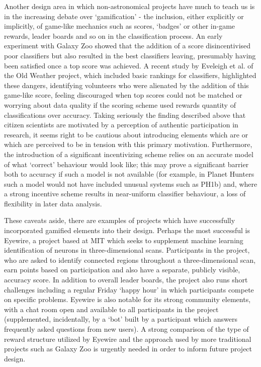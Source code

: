 \documentclass{ar2e}
\begin{document}
Another design area in which non-astronomical projects have much to teach us
is in the increasing debate over `gamification' - the inclusion, either
explicitly or implicitly, of game-like mechanics such as scores, `badges' or
other in-game rewards, leader boards and so on in the classification process.
An early experiment with Galaxy Zoo showed that the addition of a score
disincentivised poor classifiers but also resulted in the best classifiers
leaving, presumably having been satisfied once a top score was achieved. A
recent study by Eveleigh et al. of the Old Weather project, which included
basic rankings for classifiers, highlighted these dangers, identifying
volunteers who were alienated by the addition of this game-like score, feeling
discouraged when top scores could not be matched or worrying about data
quality if the scoring scheme used rewards quantity of classifications over
accuracy. Taking seriously the finding described above that citizen scientists
are motivated by a perception of authentic participation in research, it seems
right to be cautious about introducing elements which are or which are
perceived to be in tension with this primary motivation. Furthermore, the
introduction of a significant incentivizing scheme relies on an accurate model
of what `correct' behaviour would look like; this may prove a significant
barrier both to accuracy if such a model is not available (for example, in
Planet Hunters such a model would not have included unusual systems such as
PH1b) and, where a strong incentive scheme results in near-uniform classifier
behaviour, a loss of flexibility in later data analysis. 

These caveats aside, there are examples of projects which have successfully
incorporated gamified elements into their design. Perhaps the most successful
is Eyewire, a project based at MIT which seeks to supplement machine learning
identification of neurons in three-dimensional scans. Participants in the
project, who are asked to identify connected regions throughout a
three-dimensional scan, earn points based on participation and also have a
separate, publicly visible, accuracy score. In addition to overall leader
boards, the project also runs short challenges including a regular Friday
`happy hour' in which participants compete on specific problems. Eyewire is
also notable for its strong community elements, with a chat room open and
available to all participants in the project (supplemented, incidentally, by a
`bot' built by a participant which answers frequently asked questions from new
users). A strong comparison of the type of reward structure utilized by
Eyewire and the approach used by more traditional projects such as Galaxy Zoo
is urgently needed in order to inform future project design. 
\end{document}
